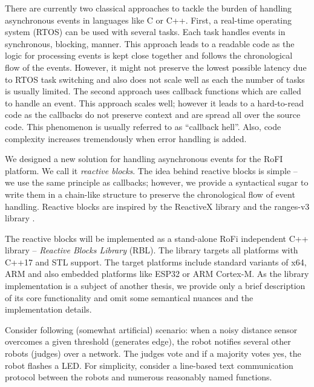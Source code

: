 There are currently two classical approaches to tackle the burden of handling
asynchronous events in languages like C or C++. First, a real-time operating
system (RTOS) can be used with several tasks. Each task handles events in
synchronous, blocking, manner. This approach leads to a readable code as the
logic for processing events is kept close together and follows the chronological
flow of the events. However, it might not preserve the lowest possible latency
due to RTOS task switching and also does not scale well as each the number of
tasks is usually limited. The second approach uses callback functions which are
called to handle an event. This approach scales well; however it leads to a
hard-to-read code as the callbacks do not preserve context and are spread all
over the source code. This phenomenon is usually referred to as ``callback
hell''. Also, code complexity increases tremendously when error handling is
added.

We designed a new solution for handling asynchronous events for the RoFI
platform. We call it \emph{reactive blocks}. The idea behind reactive blocks is
simple -- we use the same principle as callbacks; however, we provide a
syntactical sugar to write them in a chain-like structure to preserve the
chronological flow of event handling. Reactive blocks are inspired by the
ReactiveX library \cite{noauthor_reactivex_nodate} and the ranges-v3 library
\cite{noauthor_range-v3_nodate}.

The reactive blocks will be implemented as a stand-alone RoFi independent C++
library -- \emph{Reactive Blocks Library} (RBL). The library targets all
platforms with C++17 and STL support. The target platforms include standard
variants of x64, ARM and also embedded platforms like ESP32 or ARM Cortex-M. As
the library implementation is a subject of another thesis, we provide only a
brief description of its core functionality and omit some semantical nuances and
the implementation details.

Consider following (somewhat artificial) scenario: when a noisy distance sensor
overcomes a given threshold (generates edge), the robot notifies several other
robots (judges) over a network. The judges vote and if a majority votes yes, the
robot flashes a LED. For simplicity, consider a line-based text communication
protocol between the robots and numerous reasonably named functions.

